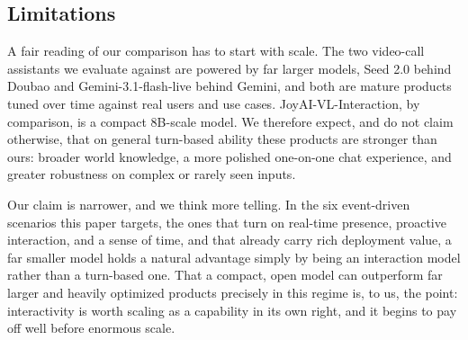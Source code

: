 


\subsection{Limitations}\label{sec:limitations}
A fair reading of our comparison has to start with scale. The two video-call assistants we evaluate against are powered by far larger models, Seed 2.0 behind Doubao and Gemini-3.1-flash-live behind Gemini, and both are mature products tuned over time against real users and use cases. JoyAI-VL-Interaction, by comparison, is a compact 8B-scale model. We therefore expect, and do not claim otherwise, that on general turn-based ability these products are stronger than ours: broader world knowledge, a more polished one-on-one chat experience, and greater robustness on complex or rarely seen inputs.

Our claim is narrower, and we think more telling. In the six event-driven scenarios this paper targets, the ones that turn on real-time presence, proactive interaction, and a sense of time, and that already carry rich deployment value, a far smaller model holds a natural advantage simply by being an interaction model rather than a turn-based one. That a compact, open model can outperform far larger and heavily optimized products precisely in this regime is, to us, the point: interactivity is worth scaling as a capability in its own right, and it begins to pay off well before enormous scale.



